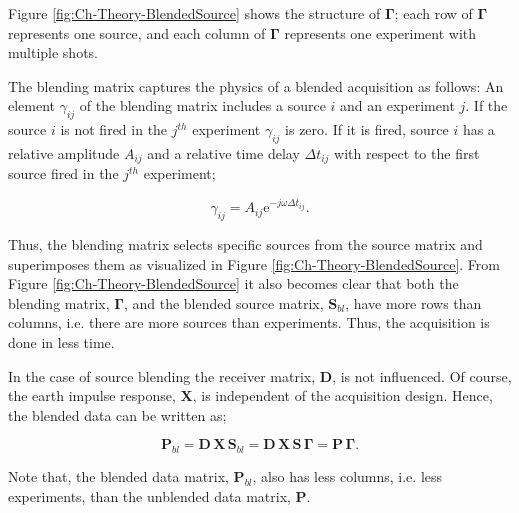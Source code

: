  Figure \ref{fig:Ch-Theory-BlendedSource} shows the structure of $\mathbf{\Gamma}$; each row of $\mathbf{\Gamma}$ represents one source, and each column of $\mathbf{\Gamma}$ represents one experiment with multiple shots. 
 
 The blending matrix captures the physics of a blended acquisition as follows: An element $\gamma_{ij}$ of the blending matrix includes a source $i$ and an experiment $j$. If the source $i$ is not fired in the $j^{th}$ experiment $\gamma_{ij}$ is zero. If it is fired, source $i$ has a relative amplitude $A_{ij}$ and a relative time delay $\Delta t_{ij}$ with respect to the first source fired in the $j^{th}$ experiment;

\begin{equation}
	\gamma_{ij} =  A_{ij} \mathrm{e}^{-j \omega \Delta t_{ij}}.
	\label{eq:Ch-Theory-BlendingElement}
\end{equation}  
 
Thus, the blending matrix selects specific sources from the source matrix and superimposes them as visualized in Figure \ref{fig:Ch-Theory-BlendedSource}. From Figure \ref{fig:Ch-Theory-BlendedSource} it also becomes clear that both the blending matrix, $\mathbf{\Gamma}$, and the blended source matrix, $\mathbf{S}_{bl}$, have more rows than columns, i.e. there are more sources than experiments. Thus, the acquisition is done in less time.

In the case of source blending the receiver matrix, $\mathbf{D}$, is not influenced. Of course, the earth impulse response, $\mathbf{X}$, is independent of the acquisition design. Hence, the blended data can be written as;

\begin{equation}
	\mathbf{P}_{bl} = \mathbf{D} \, \mathbf{X} \, \mathbf{S}_{bl} = \mathbf{D} \, \mathbf{X} \, \mathbf{S} \, \mathbf{\Gamma} = \mathbf{P \, \Gamma}.
	\label{eq:Ch-Theory-BlendedData}
\end{equation}

Note that, the blended data matrix, $\mathbf{P}_{bl}$, also has less columns, i.e. less experiments, than the unblended data matrix, $\mathbf{P}$.



